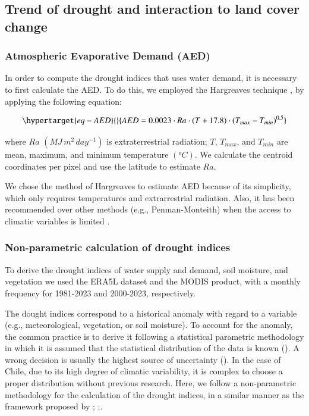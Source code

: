 \documentclass[
  authoryear,
  preprint,
  3p,
  onecolumn]{elsarticle}
\begin{document}
\hypertarget{trend-of-drought-and-interaction-to-land-cover-change}{%
\subsection{Trend of drought and interaction to land cover
change}\label{trend-of-drought-and-interaction-to-land-cover-change}}

\hypertarget{atmospheric-evaporative-demand-aed}{%
\subsubsection{Atmospheric Evaporative Demand
(AED)}\label{atmospheric-evaporative-demand-aed}}

In order to compute the drought indices that uses water demand, it is
necessary to first calculate the AED. To do this, we employed the
Hargreaves technique \citep{Hargreaves1994, Hargreaves1985}, by applying
the following equation:

\begin{equation}\protect\hypertarget{eq-AED}{}{AED = 0.0023\cdot Ra\cdot (T+17.8)\cdot (T_{max}-T_{min})^{0.5}}\label{eq-AED}\end{equation}

where \(Ra\) \((MJ\,m^2\, day^{-1})\) is extraterrestrial radiation;
\(T\), \(T_{max}\), and \(T_{min}\) are mean, maximum, and minimum
temperature \((°C)\). We calculate the centroid coordinates per pixel
and use the latitude to estimate \(Ra\).

We chose the method of Hargreaves to estimate AED because of its
simplicity, which only requires temperatures and extrarrestrial
radiation. Also, it has been recommended over other methods (e.g.,
Penman-Monteith) when the access to climatic variables is limited
\citep{Vicente-Serrano2014}.

\hypertarget{non-parametric-calculation-of-drought-indices}{%
\subsubsection{Non-parametric calculation of drought
indices}\label{non-parametric-calculation-of-drought-indices}}

To derive the drought indices of water supply and demand, soil moisture,
and vegetation we used the ERA5L dataset and the MODIS product, with a
monthly frequency for 1981-2023 and 2000-2023, respectively.

The dought indices correspond to a historical anomaly with regard to a
variable (e.g., meteorological, vegetation, or soil moisture). To
account for the anomaly, the common practice is to derive it following a
statistical parametric methodology in which it is assumed that the
statistical distribution of the data is known (\citet{Heim2002}). A
wrong decision is usually the highest source of uncertainty
(\citet{Laimighofer2022}). In the case of Chile, due to its high degree
of climatic variability, it is complex to choose a proper distribution
without previous research. Here, we follow a non-parametric methodology
for the calculation of the drought indices, in a similar manner as the
framework proposed by \citet{Farahmand2015};
\citet{Hobbins2016};\citet{McEvoy2016}.
\end{document}
